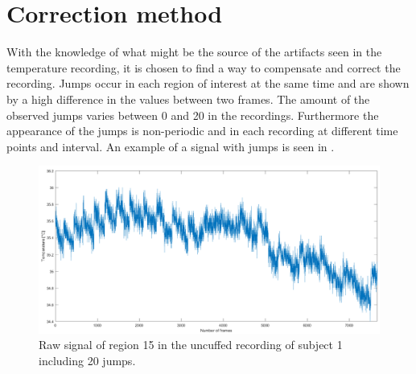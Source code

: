 \section{Correction method}
\label{sec:correction_method}
With the knowledge of what might be the source of the artifacts seen in the temperature recording, it is chosen to find a way to compensate and correct the recording.
Jumps occur in each region of interest at the same time and are shown by a high difference in the values between two frames. The amount of the observed jumps varies between 0 and 20 in the recordings. Furthermore the appearance of the jumps is non-periodic and in each recording at different time points and interval. An example of a signal with jumps is seen in .
\begin{figure}[H]
	\includegraphics[width=1\textwidth]{figures/raw15}
	\caption{Raw signal of region 15 in the uncuffed recording of subject 1 including 20 jumps.}
	\label{fig:raw15}
\end{figure}

